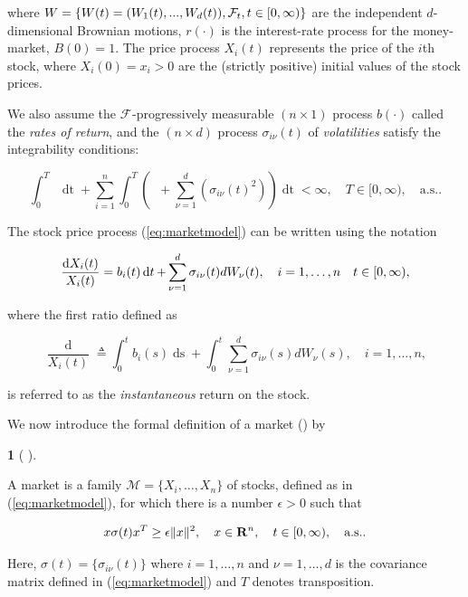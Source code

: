 \documentclass[british]{amsart} \usepackage{lmodern}
\numberwithin{equation}{section} \numberwithin{figure}{section}
\theoremstyle{plain} \newtheorem{thm}{\protect\theoremname}[section]
\theoremstyle{definition} \newtheorem{defn}[thm]{\protect\definitionname}
\theoremstyle{plain} \newtheorem{assumption}[thm]{\protect\assumptionname}
\theoremstyle{plain} \newtheorem{lem}[thm]{\protect\lemmaname}
\theoremstyle{plain} \newtheorem{prop}[thm]{\protect\propositionname}
\theoremstyle{remark} \newtheorem{rem}[thm]{\protect\remarkname}
\theoremstyle{plain} \newtheorem{cor}[thm]{\protect\corollaryname}
\renewcommand{\d}[1]{\mathop{\mathrm{d}{#1}}}
\newcommand{\filtration}[1]{\mathcal{F}_{#1}}
\newcommand{\defeq}{\mathop{\triangleq}} \newcommand{\almostsurely}{\text{a.s.}}
\newcommand{\abs}[1]{\mathop{|{#1}|}} \newcommand{\market}{\mathcal{M}}
\newcommand{\rangei}{i=1,\dots,n} \newcommand{\measure}{\mathbb{P}}
\begin{document}
where $W = \left\{ W(t)=(W_{1}(t),...,W_{d}(t)),\filtration{t},\ranget \right\}$
are the independent $d$-dimensional Brownian motions, $r(\cdot)$ is the
interest-rate process for the money-market, $B(0)=1$. The price process
$X_{i}(t)$ represents the price of the $i$th stock, where $X_{i}(0) = x_{i} > 0$
are the (strictly positive) initial values of the stock prices.

We also assume the $\filtration{}$-progressively measurable $(n \times 1)$
process $b(\cdot)$ called the \textit{rates of return}, and the $(n \times d)$
process $\sigma_{i\nu}(t)$ of \textit{volatilities} satisfy the integrability
conditions: 

\begin{equation*}
  \int_{0}^{T} 
  \abs{r(t)} 
  \d{t} +
  \sum_{i=1}^{n} \int_{0}^{T} 
    \left( 
        \abs{b_{i}(t)} +
        \sum_{\nu=1}^{d} ( \sigma_{i\nu}(t)^2  ) 
        \right) \d{t} < \infty,
  \quad T \in [0, \infty),
  \quad \almostsurely.
  \end{equation*}


The stock price process (\ref{eq:marketmodel}) can be written using the notation 

\begin{equation}
  \label{eq:stockpriceprocessdiff}
    \frac{\d{X_{i}(t)}}{X_{i}(t)} = b_{i}(t)\d{t} + \sum_{\nu=1}^{d} \sigma_{i\nu}(t) dW_{\nu}(t),
  \quad \rangei
  \quad \ranget,
\end{equation}

where the first ratio defined as

\begin{equation*}
  \frac{\d{X_{i}(t)}}{X_{i}(t)} \defeq 
  \int_{0}^{t} b_{i}(s)\d{s} + 
  \int_{0}^{t} \sum_{\nu=1}^{d} \sigma_{i\nu}(s) dW_{\nu}(s),
  \quad \rangei,
\end{equation*}

is referred to as the \textit{instantaneous} return on the stock.

We now introduce the formal definition of a market (\market) by 

\begin{defn} 
[
  {\cite[Definition 2.2]{fernholz1999pgf}}
]
\label{def:market}

A market is a family $\market = \{X_{i},\dots,X_{n}\}$ of stocks, defined as in
(\ref{eq:marketmodel}), for which there is a number $\epsilon>0$ such that

\begin{equation}
  \label{eq:strongnondegeneracy}
  x \sigma(t) x^{T} \ge \epsilon \|x\|^{2}, 
  \quad x \in \mathbf{R}^{n}, 
  \quad \ranget,
  \quad \almostsurely.
\end{equation}

Here, $\sigma(t) = \{\sigma_{i\nu}(t)\}$ where $\rangei$ and $\nu=1,\dots,d$ is the
covariance matrix defined in (\ref{eq:marketmodel}) and $T$ denotes
transposition.

\end{defn}
\end{document}
